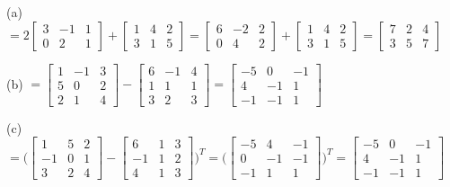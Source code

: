 \documentclass[addpoints]{exam}
\begin{document}
\begin{questions}
\begin{solution}
        (a) $ = 2\begin{bmatrix}
            3 & -1 & 1 \\ 0 & 2 & 1
        \end{bmatrix} + \begin{bmatrix}
            1 & 4 & 2 \\ 3 & 1 & 5
        \end{bmatrix} = \begin{bmatrix}
            6 & -2 & 2 \\ 0 & 4 & 2
        \end{bmatrix} + \begin{bmatrix}
            1 & 4 & 2 \\ 3 & 1 & 5
        \end{bmatrix} = \begin{bmatrix}
            7 & 2 & 4 \\ 3 & 5 & 7
        \end{bmatrix} $

        (b) $ = \begin{bmatrix}
            1 & -1 & 3 \\ 5 & 0 & 2 \\ 2 & 1 & 4
        \end{bmatrix} - \begin{bmatrix}
            6 & -1 & 4 \\ 1 & 1 & 1 \\ 3 & 2 & 3
        \end{bmatrix} = \begin{bmatrix}
            -5 & 0 & -1 \\ 4 & -1 & 1 \\ -1 & -1 & 1
        \end{bmatrix}$

        (c) $ = \Biggl(\begin{bmatrix}
            1 & 5 & 2 \\ -1 &  0 & 1 \\ 3 & 2 & 4
        \end{bmatrix} - \begin{bmatrix}
            6 & 1 & 3 \\ -1 & 1 & 2 \\ 4 & 1 & 3
        \end{bmatrix}\Biggr)^T = \Biggl( \begin{bmatrix}
            -5 & 4 & -1 \\ 0 & -1 & -1 \\ -1 & 1 & 1
        \end{bmatrix} \Biggr)^T = \begin{bmatrix}
            -5 & 0 & -1 \\ 4 & -1 & 1 \\ -1 & -1 & 1
        \end{bmatrix} $


\end{solution}
\end{questions}
\end{document}
